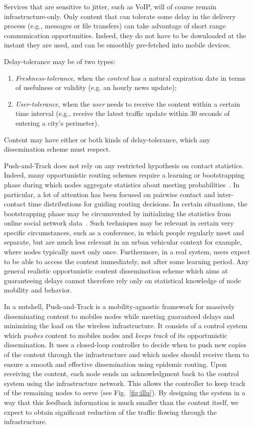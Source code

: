\documentclass[preprint]{elsarticle}
\begin{document}
Services that are sensitive to jitter, such as VoIP, will of course remain infrastructure-only. Only content that can tolerate some delay in the delivery process (e.g., messages or file transfers) can take advantage of short range communication opportunities. Indeed, they do not have to be downloaded at the instant they are used, and can be smoothly pre-fetched into mobile devices. 

Delay-tolerance may be of two types:
\begin{enumerate}
\item \emph{Freshness-tolerance}, when the \emph{content} has a natural expiration date in terms of usefulness or validity (e.g. an hourly news update);
\item \emph{User-tolerance}, when the \emph{user} needs to receive the content within a certain time interval (e.g., receive the latest traffic update within 30 seconds of entering a city's perimeter).
\end{enumerate}
Content may have either or both kinds of delay-tolerance, which any dissemination scheme must respect.

Push-and-Track does not rely on any restricted hypothesis on contact statistics. Indeed, many opportunistic routing schemes require a learning or bootstrapping phase during which nodes aggregate statistics about meeting probabilities~\cite{lindgren03}. In particular, a lot of attention has been focused on pairwise contact and inter-contact time distributions for guiding routing decisions. In certain situations, the bootstrapping phase may be circumvented by initializing the statistics from online social network data~\cite{Bigwood2011}. Such techniques may be relevant in certain very specific circumstances, such as a conference, in which people regularly meet and separate, but are much less relevant in an urban vehicular context for example, where nodes typically meet only once. Furthermore, in a real system, users expect to be able to access the content immediately, not after some learning period. Any general realistic opportunistic content dissemination scheme which aims at guaranteeing delays cannot therefore rely only on statistical knowledge of node mobility and behavior.

In a nutshell, Push-and-Track is a mobility-agnostic framework for massively disseminating content to mobiles nodes while meeting guaranteed delays and minimizing the load on the wireless infrastructure. It consists of a control system which \textit{pushes} content to mobiles nodes and \textit{keeps track} of its opportunistic dissemination. It uses a closed-loop controller to decide when to push new copies of the content through the infrastructure and which nodes should receive them to ensure a smooth and effective dissemination using epidemic routing. Upon receiving the content, each node sends an acknowledgment back to the control system using the infrastructure network. This allows the controller to keep track of the remaining nodes to serve (see Fig.~\ref{fig:illu}). By designing the system in a way that this feedback information is much smaller than the content itself, we expect to obtain significant reduction of the traffic flowing through the infrastructure.
\end{document}
